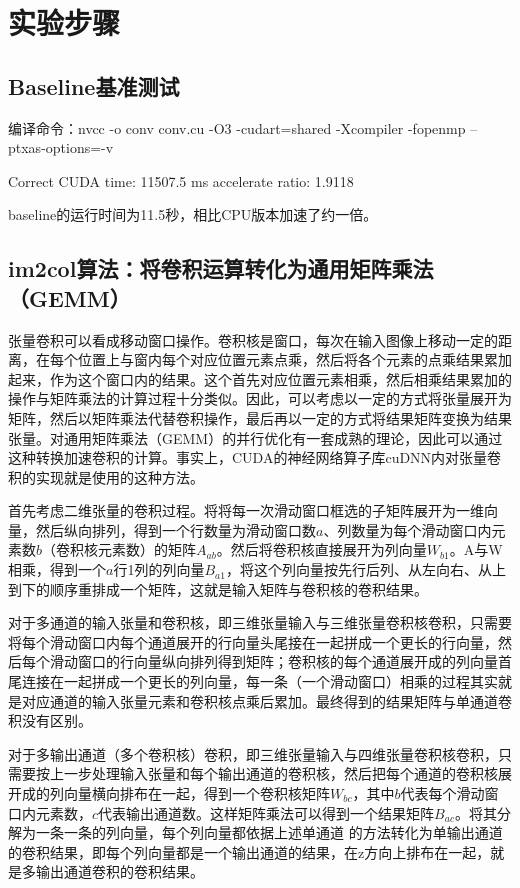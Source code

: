 \documentclass[UTF8,10pt]{ctexart}
\begin{document}
\section{实验步骤}
\subsection{Baseline基准测试}
\begin{python}
编译命令：nvcc -o conv conv.cu -O3 -cudart=shared -Xcompiler -fopenmp --ptxas-options=-v
\end{python}
\begin{python}
Correct
CUDA time: 11507.5 ms
accelerate ratio: 1.9118
\end{python}
baseline的运行时间为11.5秒，相比CPU版本加速了约一倍。

\subsection{im2col算法：将卷积运算转化为通用矩阵乘法（GEMM）}
张量卷积可以看成移动窗口操作。卷积核是窗口，每次在输入图像上移动一定的距离，在每个位置上与窗内每个对应位置元素点乘，然后将各个元素的点乘结果累加起来，作为这个窗口内的结果。这个首先对应位置元素相乘，然后相乘结果累加的操作与矩阵乘法的计算过程十分类似。因此，可以考虑以一定的方式将张量展开为矩阵，然后以矩阵乘法代替卷积操作，最后再以一定的方式将结果矩阵变换为结果张量。对通用矩阵乘法（GEMM）的并行优化有一套成熟的理论，因此可以通过这种转换加速卷积的计算。事实上，CUDA的神经网络算子库cuDNN内对张量卷积的实现就是使用的这种方法。

首先考虑二维张量的卷积过程。将将每一次滑动窗口框选的子矩阵展开为一维向量，然后纵向排列，得到一个行数量为滑动窗口数$a$、列数量为每个滑动窗口内元素数$b$（卷积核元素数）的矩阵$A_{ab}$。然后将卷积核直接展开为列向量$W_{b1}$。A与W相乘，得到一个$a$行1列的列向量$B_{a1}$，将这个列向量按先行后列、从左向右、从上到下的顺序重排成一个矩阵，这就是输入矩阵与卷积核的卷积结果。

对于多通道的输入张量和卷积核，即三维张量输入与三维张量卷积核卷积，只需要将每个滑动窗口内每个通道展开的行向量头尾接在一起拼成一个更长的行向量，然后每个滑动窗口的行向量纵向排列得到矩阵；卷积核的每个通道展开成的列向量首尾连接在一起拼成一个更长的列向量，每一条（一个滑动窗口）相乘的过程其实就是对应通道的输入张量元素和卷积核点乘后累加。最终得到的结果矩阵与单通道卷积没有区别。

对于多输出通道（多个卷积核）卷积，即三维张量输入与四维张量卷积核卷积，只需要按上一步处理输入张量和每个输出通道的卷积核，然后把每个通道的卷积核展开成的列向量横向排布在一起，得到一个卷积核矩阵$W_{bc}$，其中$b$代表每个滑动窗口内元素数，$c$代表输出通道数。这样矩阵乘法可以得到一个结果矩阵$B_{ac}$。将其分解为一条一条的列向量，每个列向量都依据上述单通道 的方法转化为单输出通道的卷积结果，即每个列向量都是一个输出通道的结果，在z方向上排布在一起，就是多输出通道卷积的卷积结果。
\end{document}
